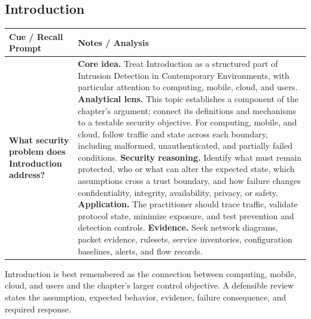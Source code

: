 \documentclass[11pt]{article}
\newcommand{\CornellHeader}{%
\rowcolor{Navy}\color{white}\bfseries Cue / Recall Prompt & \color{white}\bfseries Notes / Analysis\\\hline}
\newcommand{\CornellRow}[2]{%
\cellcolor{CueGray}\RaggedRight\textbf{#1} & \RaggedRight #2\\\hline}
\begin{document}
\subsection*{Introduction}
\begin{longtable}{>{\RaggedRight\arraybackslash}p{}|>{\RaggedRight\arraybackslash}p{}}
\CornellHeader
\CornellRow{What security problem does Introduction address?}{\textbf{Core idea.} Treat Introduction as a structured part of Intrusion Detection in Contemporary Environments, with particular attention to computing, mobile, cloud, and users. \textbf{Analytical lens.} This topic establishes a component of the chapter's argument; connect its definitions and mechanisms to a testable security objective. For computing, mobile, and cloud, follow traffic and state across each boundary, including malformed, unauthenticated, and partially failed conditions. \textbf{Security reasoning.} Identify what must remain protected, who or what can alter the expected state, which assumptions cross a trust boundary, and how failure changes confidentiality, integrity, availability, privacy, or safety. \textbf{Application.} The practitioner should trace traffic, validate protocol state, minimize exposure, and test prevention and detection controls. \textbf{Evidence.} Seek network diagrams, packet evidence, rulesets, service inventories, configuration baselines, alerts, and flow records.}
\end{longtable}
\begin{topicsummary}
Introduction is best remembered as the connection between computing, mobile, cloud, and users and the chapter's larger control objective. A defensible review states the assumption, expected behavior, evidence, failure consequence, and required response.
\end{topicsummary}
\end{document}
